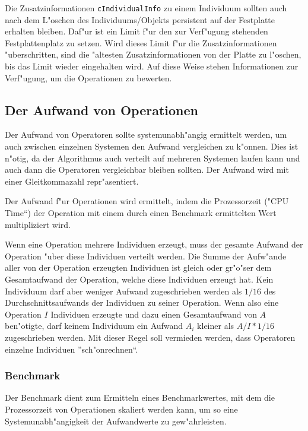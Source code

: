 Die Zusatzinformationen \verb|cIndividualInfo| zu einem Individuum sollten auch nach dem L"oschen des Individuums/Objekts persistent auf der Festplatte erhalten bleiben. Daf"ur ist ein Limit f"ur den zur Verf"ugung stehenden Festplattenplatz zu setzen. Wird dieses Limit f"ur die Zusatzinformationen "uberschritten, sind die "altesten Zusatzinformationen von der Platte zu l"oschen, bis das Limit wieder eingehalten wird.
Auf diese Weise stehen Informationen zur Verf"ugung, um die Operationen zu bewerten.


\subsection{Der Aufwand von Operationen}
\label{secOperationCost}

Der Aufwand von Operatoren sollte systemunabh"angig ermittelt werden, um auch zwischen einzelnen Systemen den Aufwand vergleichen zu k"onnen. Dies ist n"otig, da der Algorithmus auch verteilt auf mehreren Systemen laufen kann und auch dann die Operatoren vergleichbar bleiben sollten. Der Aufwand wird mit einer Gleitkommazahl repr"asentiert.

Der Aufwand f"ur Operationen wird ermittelt, indem die Prozessorzeit ("CPU Time``) der Operation mit einem durch einen Benchmark ermittelten Wert multipliziert wird.


Wenn eine Operation mehrere Individuen erzeugt, muss der gesamte Aufwand der Operation "uber diese Individuen verteilt werden. Die Summe der Aufw"ande aller von der Operation erzeugten Individuen ist gleich oder gr"o"ser dem Gesamtaufwand der Operation, welche diese Individuen erzeugt hat. Kein Individuum darf aber weniger Aufwand zugeschrieben werden als $1/16$ des Durchschnittsaufwands der Individuen zu seiner Operation. Wenn also eine Operation $I$ Individuen erzeugte und dazu einen Gesamtaufwand von $A$ ben"otigte, darf keinem Individuum ein Aufwand $A_i$ kleiner als $A/I*1/16$ zugeschrieben werden. Mit dieser Regel soll vermieden werden, dass Operatoren einzelne Individuen ''sch"onrechnen``.


\subsubsection{Benchmark}

Der Benchmark dient zum Ermitteln eines Benchmarkwertes, mit dem die Prozessorzeit von Operationen skaliert werden kann, um so eine Systemunabh"angigkeit der Aufwandwerte zu gew"ahrleisten.

